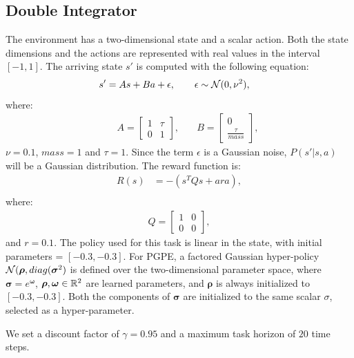 \subsection{Double Integrator}\label{sec:di}
The environment has a two-dimensional state and a scalar action. 
Both the state dimensions and the actions are represented with real values in the interval $[-1, 1]$. The arriving state $s'$ is computed with the following equation:
\begin{align}
s' &= As + Ba + \epsilon, \qquad \epsilon\sim\mathcal{N}(0,\nu^2),\nonumber
\end{align}
where:
\begin{align}
&\quad A =
\begin{bmatrix}
1 & \tau \\
0 & 1 
\end{bmatrix}, &\quad 
B =
\begin{bmatrix}
0 \\
\frac{\tau}{mass} 
\end{bmatrix},\nonumber
\end{align}
$\nu=0.1$, $mass=1$ and $\tau = 1$.
Since the term $\epsilon$ is a Gaussian noise, $P(s'|s,a)$ will be a Gaussian distribution.
The reward function is:
\begin{align}
R(s) &= - (s^TQs + ara),\nonumber\\
\end{align}
where:
\begin{align}
Q =
\begin{bmatrix}
1 & 0 \\
0 & 0
\end{bmatrix},
\end{align}
and $r = 0.1 $.
The policy used for this task is linear in the state, with initial parameters = $[-0.3, -0.3]$. For PGPE, a factored Gaussian hyper-policy $\mathcal{N}(\boldsymbol{\rho},\mathop{diag}(\boldsymbol{\sigma}^2)$ is defined over the two-dimensional parameter space, where $\boldsymbol{\sigma}=e^{\boldsymbol{\omega}}$, $\boldsymbol{\rho},\boldsymbol{\omega}\in\mathbb{R}^2$ are learned parameters, and $\boldsymbol{\rho}$ is always initialized to $[-0.3,-0.3]$. Both the components of $\boldsymbol{\sigma}$ are initialized to the same scalar $\sigma$, selected as a hyper-parameter. 

We set a discount factor of $\gamma=0.95$ and a maximum task horizon of $20$ time steps.

